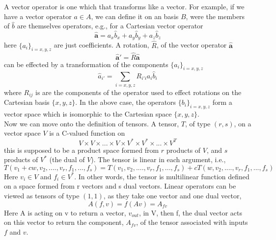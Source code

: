 \documentclass[12pt]{article}
\begin{document}
\noindent A vector operator is one which that transforms like a vector.
For example, if we have a vector operator $a\in A$, we can
define it on an basis $B$, were the members of $\hat{b}$ are 
themselves operators, e.g., for a Cartesian vector operator
\begin{equation}
\mathbf{\hat{a}}  = a_{x}\hat{b}_{x}+a_{y}\hat{b}_{y}+a_{z}\hat{b}_{z}
\end{equation}
here $\{a_{i}\}_{i=x,y,z}$ are just coefficients. A rotation, $\hat{R}$, of the
vector operator $\mathbf{\hat{a}}$ 
\begin{equation}
\mathbf{\hat{a}'} = \hat{R}\mathbf{\hat{a}}
\end{equation}
can be effected by a transformation of the components $\{a_{i}\}_{i=x,y,z}$
\begin{equation}
\hat{a}_{i'} = \sum_{i=x,y,z} R_{i'i} a_{i}\hat{b}_{i}
\end{equation}
\noindent where $R_{ij}$ is are the components of the operator used to
effect rotations on the Cartesian basis $\{x,y,z\}$. In the above case,
the operators $\{b_{i}\}_{i=x,y,z}$ form a vector space which is isomorphic
to the Cartesian space $\{x,y,z\}$. \\

\noindent Now we can move onto the definition of tensors. A tensor, $T$, of type
$(r,s)$, on a vector space $V$ is a C-valued function on
\begin{equation}
V\times V\times ... \times V \times V^{*} \times V^{*} \times ... \times V^{T}
\end{equation}
this is supposed to be a product space formed from $r$ products of $V$, and $s$ products
of $V^{*}$ (the dual of $V$). The tensor is linear in each argument, i.e.,
\begin{equation}
T(v_{1}+cw, v_{2},...., v_{r}, f_{1}, ..., f_{s} )=
T(v_{1}, v_{2},...., v_{r}, f_{1}, ..., f_{s} )+
cT(w, v_{2},...., v_{r}, f_{1}, ..., f_{s} )
\end{equation}
Here $v_{i}\in V$ and $f_{i} \in V^{*}$.
In other words, the tensor is multilinear function defined on a space formed
from r vectors and s dual vectors. Linear operators can be viewed
as tensors of type $(1,1)$, as they take one vector and one dual vector,
\begin{equation}
A(f,v) = f(Av) = A_{fv} 
\end{equation}
Here A is acting on v to return a vector, $v_{out}$, in V, then f, the dual vector acts on 
this vector to return the component, $A_{fv}$, of the tensor associated with inputs $f$ and $v$.\\
\end{document}
